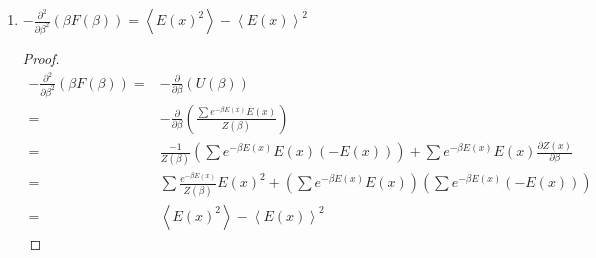 \documentclass[letterpaper,english,10pt]{article}
\begin{document}
\begin{lem}
\begin{enumerate}
\begin{proof}
\begin{align*}
S(\beta)=& \ln Z(\beta)+\sum \mu_{\beta} \left(-\ln \mu_\beta(x)-\ln Z(\beta) \right)  \\
=&-\sum \mu_\beta \ln \mu_\beta(x)  \hspace{15mm} (\sum \mu_{\beta}(x)=1)\\
=&H(\mu_\beta)/\ln 2
\end{align*}
\end{proof}
\textbf{Thus, the canonical entropy is the Shannon entropy of the Boltzmann distribution (up to a multiplicative constant).} 
\item $-\frac{\partial ^2}{\partial \beta^2} \left( \beta F(\beta) \right)=\left\langle E(x)^2 \right\rangle-\left\langle E(x) \right\rangle^2$
\begin{proof}
\begin{align*}
-\frac{\partial ^2}{\partial \beta^2} \left( \beta F(\beta) \right)=&-\frac{\partial}{\partial \beta} \left( U(\beta)\right) \\
=&-\frac{\partial}{\partial \beta} \left( \frac{\sum e^{-\beta E(x)} E(x)} {Z(\beta)}\right) \\
=&\frac{-1}{Z(\beta)} \left(\sum e^{-\beta E(x)} E(x) (-E(x)) \right)+\sum e^{-\beta E(x)} E(x) \frac{\partial Z(x)}{\partial \beta} \\
=& \sum \frac{e^{-\beta E(x)}}{Z(\beta)} E(x)^2+\left(\sum e^{-\beta E(x)} E(x)\right) \left( \sum e^{-\beta E(x)} (-E(x))\right) \\
=&\left\langle E(x)^2 \right\rangle-\left\langle E(x) \right\rangle^2
\end{align*}
\end{proof}
\end{enumerate}
\end{lem}
\end{document}
